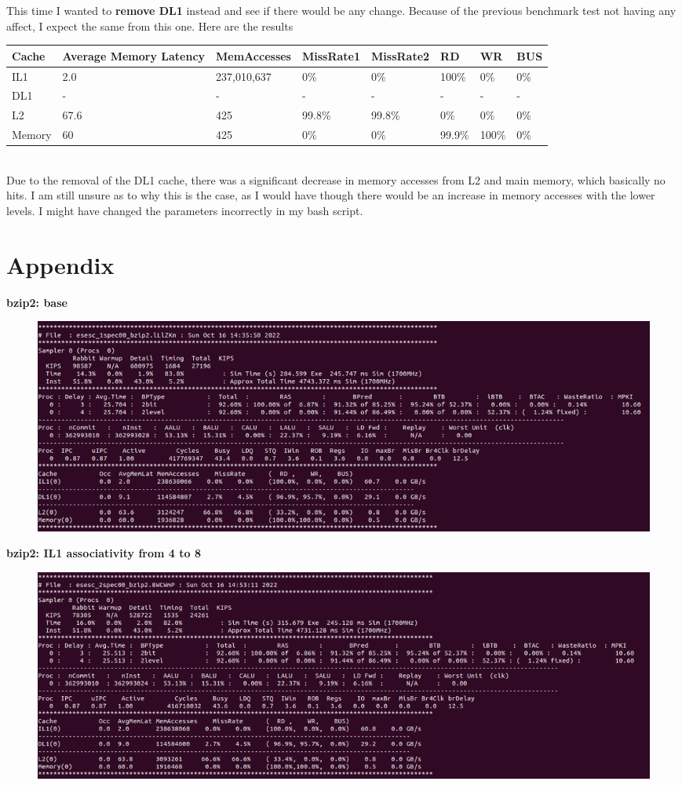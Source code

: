 \documentclass[12pt]{article}
\begin{document}
This time I wanted to \textbf{remove DL1} instead and see if there would be any change. Because of the previous benchmark test not having any affect, I expect the same from this one. Here are the results
\begin{table}[!h]
\centering
\begin{tabular}{|l|l|l|l|l|l|l|l|}
\hline
\rowcolor[HTML]{C0C0C0} 
Cache & Average Memory Latency & MemAccesses & MissRate1 & MissRate2 & RD & WR & BUS \\ \hline
IL1 & 2.0 & 237,010,637 & 0\% & 0\% & 100\% & 0\% & 0\% \\ \hline
DL1 & - & - & - & - & - & - & - \\ \hline
L2 & 67.6 & 425 & 99.8\% & 99.8\% & 0\% & 0\% & 0\% \\ \hline
Memory & 60 & 425 & 0\% & 0\% & 99.9\% & 100\% & 0\% \\ \hline
\end{tabular}
\end{table}\\
Due to the removal of the DL1 cache, there was a significant decrease in memory accesses from L2 and main memory, which basically no hits. I am still unsure as to why this is the case, as I would have though there would be an increase in memory accesses with the lower levels. I might have changed the parameters incorrectly in my bash script.
\newpage
\section*{Appendix}
\textbf{bzip2: base}
\begin{figure}[h!]
	\includegraphics[scale=0.4]{img/bzip1.png}
\end{figure}

\textbf{bzip2: IL1 associativity from 4 to 8}
\begin{figure}[h!]
	\includegraphics[scale=0.4]{img/bzip2.png}
\end{figure}
\end{document}

